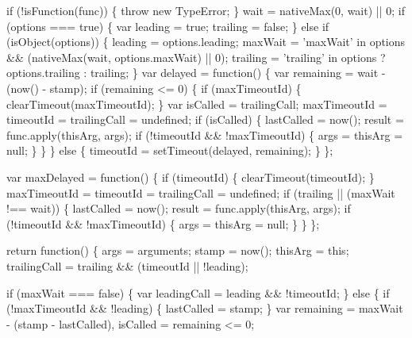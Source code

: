 \begin{DoxyCodeInclude}
{{    \textcolor{keywordflow}{if} (!isFunction(func)) \{
      \textcolor{keywordflow}{throw} \textcolor{keyword}{new} TypeError;
    \}
    wait = nativeMax(0, wait) || 0;
    \textcolor{keywordflow}{if} (options === \textcolor{keyword}{true}) \{
      var leading = \textcolor{keyword}{true};
      trailing = \textcolor{keyword}{false};
    \} \textcolor{keywordflow}{else} \textcolor{keywordflow}{if} (isObject(options)) \{
      leading = options.leading;
      maxWait = \textcolor{stringliteral}{'maxWait'} in options && (nativeMax(wait, options.maxWait) || 0);
      trailing = \textcolor{stringliteral}{'trailing'} in options ? options.trailing : trailing;
    \}
    var delayed = \textcolor{keyword}{function}() \{
      var remaining = wait - (now() - stamp);
      \textcolor{keywordflow}{if} (remaining <= 0) \{
        \textcolor{keywordflow}{if} (maxTimeoutId) \{
          clearTimeout(maxTimeoutId);
        \}
        var isCalled = trailingCall;
        maxTimeoutId = timeoutId = trailingCall = undefined;
        \textcolor{keywordflow}{if} (isCalled) \{
          lastCalled = now();
          result = func.apply(thisArg, args);
          \textcolor{keywordflow}{if} (!timeoutId && !maxTimeoutId) \{
            args = thisArg = null;
          \}
        \}
      \} \textcolor{keywordflow}{else} \{
        timeoutId = setTimeout(delayed, remaining);
      \}
    \};

    var maxDelayed = \textcolor{keyword}{function}() \{
      \textcolor{keywordflow}{if} (timeoutId) \{
        clearTimeout(timeoutId);
      \}
      maxTimeoutId = timeoutId = trailingCall = undefined;
      \textcolor{keywordflow}{if} (trailing || (maxWait !== wait)) \{
        lastCalled = now();
        result = func.apply(thisArg, args);
        \textcolor{keywordflow}{if} (!timeoutId && !maxTimeoutId) \{
          args = thisArg = null;
        \}
      \}
    \};

    \textcolor{keywordflow}{return} \textcolor{keyword}{function}() \{
      args = arguments;
      stamp = now();
      thisArg = \textcolor{keyword}{this};
      trailingCall = trailing && (timeoutId || !leading);

      \textcolor{keywordflow}{if} (maxWait === \textcolor{keyword}{false}) \{
        var leadingCall = leading && !timeoutId;
      \} \textcolor{keywordflow}{else} \{
        \textcolor{keywordflow}{if} (!maxTimeoutId && !leading) \{
          lastCalled = stamp;
        \}
        var remaining = maxWait - (stamp - lastCalled),
            isCalled = remaining <= 0;

}}
\end{DoxyCodeInclude}
